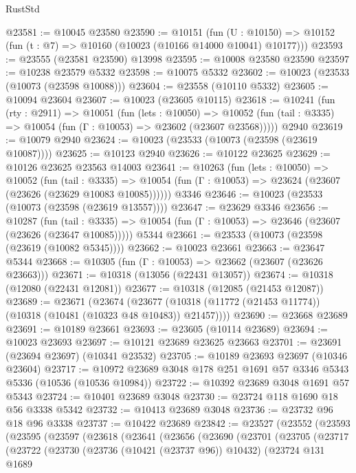\begin{lexlean}{RustStd}
\begin{coremodule}
@23581 := @10045 @23580
@23590 := @10151
    (fun (U : @10150) => @10152 (fun (t : @7) => @10160 (@10023 (@10166 @14000 @10041) @10177)))
@23593 := @23555 (@23581 @23590) @13998
@23595 := @10008 @23580 @23590
@23597 := @10238 @23579 @5332
@23598 := @10075 @5332
@23602 := @10023 (@23533 (@10073 (@23598 @10088)))
@23604 := @23558 (@10110 @5332)
@23605 := @10094 @23604
@23607 := @10023 (@23605 @10115)
@23618 := @10241
    (fun (rty : @2911) =>
    @10051
      (fun (lets : @10050) =>
      @10052 (fun (tail : @3335) => @10054 (fun (Γ : @10053) => @23602 (@23607 @23568)))))
    @2940
@23619 := @10079 @2940
@23624 := @10023 (@23533 (@10073 (@23598 (@23619 @10087))))
@23625 := @10123 @2940
@23626 := @10122 @23625
@23629 := @10126 @23625 @23563 @14003
@23641 := @10263
    (fun (lets : @10050) =>
    @10052
      (fun (tail : @3335) =>
      @10054 (fun (Γ : @10053) => @23624 (@23607 (@23626 (@23629 @10083 @10085))))))
    @3346
@23646 := @10023 (@23533 (@10073 (@23598 (@23619 @13557))))
@23647 := @23629 @3346
@23656 := @10287
    (fun (tail : @3335) => @10054 (fun (Γ : @10053) => @23646 (@23607 (@23626 (@23647 @10085)))))
    @5344
@23661 := @23533 (@10073 (@23598 (@23619 (@10082 @5345))))
@23662 := @10023 @23661
@23663 := @23647 @5344
@23668 := @10305 (fun (Γ : @10053) => @23662 (@23607 (@23626 @23663)))
@23671 := @10318 (@13056 (@22431 @13057))
@23674 := @10318 (@12080 (@22431 @12081))
@23677 := @10318 (@12085 (@21453 @12087))
@23689 := @23671
    (@23674 (@23677 (@10318 (@11772 (@21453 @11774)) (@10318 (@10481 (@10323 @48 @10483)) @21457))))
@23690 := @23668 @23689
@23691 := @10189 @23661
@23693 := @23605 (@10114 @23689)
@23694 := @10023 @23693
@23697 := @10121 @23689 @23625 @23663
@23701 := @23691 (@23694 @23697) (@10341 @23532)
@23705 := @10189 @23693 @23697 (@10346 @23604)
@23717 := @10972 @23689 @3048 @178 @251 @1691 @57 @3346 @5343 @5336 (@10536 (@10536 @10984))
@23722 := @10392 @23689 @3048 @1691 @57 @5343
@23724 := @10401 @23689 @3048
@23730 := @23724 @118 @1690 @18 @56 @3338 @5342
@23732 := @10413 @23689 @3048
@23736 := @23732 @96 @18 @96 @3338
@23737 := @10422 @23689
@23842 := @23527
    (@23552
      (@23593
        (@23595
          (@23597
            (@23618
              (@23641
                (@23656
                  (@23690
                    (@23701
                      (@23705
                        (@23717
                          (@23722
                            (@23730
                              (@23736 (@10421 (@23737 @96)) @10432)
                              (@23724
                                @131
                                @1689

\end{coremodule}
\end{lexlean}
